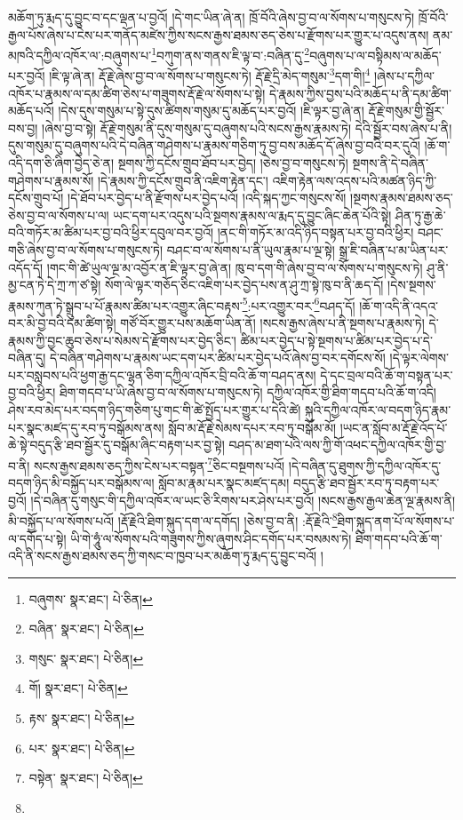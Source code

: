 མཆོག་ཏུ་རྨད་དུ་བྱུང་བ་དང་ལྡན་པ་བྱའོ། །དེ་གང་ཡིན་ཞེ་ན། ཁྲོ་བོའི་ཞེས་བྱ་བ་ལ་སོགས་པ་གསུངས་ཏེ། ཁྲོ་བོའི་རྒྱལ་པོས་ཞེས་པ་ངེས་པར་གནོད་མཛེས་ཀྱིས་སངས་རྒྱས་ཐམས་ཅད་ཅེས་པ་རྫོགས་པར་གྱུར་པ་འདུས་ནས། ནམ་མཁའི་དཀྱིལ་འཁོར་ལ་:བཞུགས་པ་\footnote{བཞུགས་  སྣར་ཐང་།  པེ་ཅིན། }བཀུག་ནས་གནས་ཇི་ལྟ་བ་:བཞིན་དུ་\footnote{བཞིན་  སྣར་ཐང་།  པེ་ཅིན། }བཞུགས་པ་ལ་བསྟིམས་ལ་མཆོད་པར་བྱའོ། །ཇི་ལྟ་ཞེ་ན། རྡོ་རྗེ་ཞེས་བྱ་བ་ལ་སོགས་པ་གསུངས་ཏེ། རྡོ་རྗེ་དྲི་མེད་གསུམ་\footnote{གསུང་  སྣར་ཐང་།  པེ་ཅིན། }དག་གི།\footnote{གོ།  སྣར་ཐང་།  པེ་ཅིན། } །ཞེས་པ་དཀྱིལ་འཁོར་པ་རྣམས་ལ་དམ་ཚིག་ཅེས་པ་གཟུགས་རྡོ་རྗེ་ལ་སོགས་པ་སྟེ། དེ་རྣམས་ཀྱིས་བྱས་པའི་མཆོད་པ་ནི་དམ་ཚིག་མཆོད་པའོ། །དེས་དུས་གསུམ་པ་སྟེ་དུས་ཚིགས་གསུམ་དུ་མཆོད་པར་བྱའོ། །ཇི་ལྟར་བྱ་ཞེ་ན། རྡོ་རྗེ་གསུམ་གྱི་སྦྱོར་བས་བྱ། །ཞེས་བྱ་བ་སྟེ། རྡོ་རྗེ་གསུམ་ནི་དུས་གསུམ་དུ་བཞུགས་པའི་སངས་རྒྱས་རྣམས་ཏེ། དེའི་སྦྱོར་བས་ཞེས་པ་ནི། དུས་གསུམ་དུ་བཞུགས་པའི་དེ་བཞིན་གཤེགས་པ་རྣམས་གཅིག་ཏུ་བྱ་བས་མཆོད་དོ་ཞེས་བྱ་བའི་བར་དུའོ། །ཆོ་ག་འདི་དག་ཅི་ཞིག་བྱེད་ཅེ་ན། སྔགས་ཀྱི་དངོས་གྲུབ་ཐོབ་པར་བྱེད། །ཅེས་བྱ་བ་གསུངས་ཏེ། སྔགས་ནི་དེ་བཞིན་གཤེགས་པ་རྣམས་སོ། །དེ་རྣམས་ཀྱི་དངོས་གྲུབ་ནི་འཇིག་རྟེན་དང་། འཇིག་རྟེན་ལས་འདས་པའི་མཚན་ཉིད་ཀྱི་དངོས་གྲུབ་པོ། །དེ་ཐོབ་པར་བྱེད་པ་ནི་རྫོགས་པར་བྱེད་པའོ། །འདི་སྐད་ཀྱང་གསུངས་སོ། །སྔགས་རྣམས་ཐམས་ཅད་ཅེས་བྱ་བ་ལ་སོགས་པ་ལ། ཡང་དག་པར་འདུས་པའི་སྔགས་རྣམས་ལ་རྨད་དུ་བྱུང་ཞིང་ཆེན་པོའི་སྟེ། ཤིན་ཏུ་རྒྱ་ཆེ་བའི་གཏོར་མ་ཚིམ་པར་བྱ་བའི་ཕྱིར་དབུལ་བར་བྱའོ། །ནང་གི་གཏོར་མ་འདི་ཉིད་བསྟན་པར་བྱ་བའི་ཕྱིར། བཤང་གཅི་ཞེས་བྱ་བ་ལ་སོགས་པ་གསུངས་ཏེ། བཤང་བ་ལ་སོགས་པ་ནི་ཡུལ་རྣམ་པ་ལྔ་སྟེ། སྒྲ་ཇི་བཞིན་པ་མ་ཡིན་པར་འདོད་དོ། །གང་གི་ཚེ་ཡུལ་ལྔ་མ་འབྱོར་ན་ཇི་ལྟར་བྱ་ཞེ་ན། ཁུ་བ་དག་གི་ཞེས་བྱ་བ་ལ་སོགས་པ་གསུངས་ཏེ། ཤུ་ནི་མྱ་ངན་ཏེ་དེ་ཀྲ་ཀ་ཙ་སྟེ། སོག་ལེ་ལྟར་གཅོད་ཅིང་འཇིག་པར་བྱེད་པས་ན་ཤུ་ཀྲ་སྟེ་ཁུ་བ་ནི་ཆད་དོ། །དེས་སྔགས་རྣམས་ཀུན་ཏེ་སྒྲུབ་པ་པོ་རྣམས་ཚིམ་པར་འགྱུར་ཞིང་བརྟས་\footnote{རྟས་  སྣར་ཐང་།  པེ་ཅིན། }:པར་འགྱུར་བར་\footnote{པར་  སྣར་ཐང་།  པེ་ཅིན། }བཤད་དོ། །ཆོ་ག་འདི་ནི་འདའ་བར་མི་བྱ་བའི་དམ་ཚིག་སྟེ། གཙོ་བོར་གྱུར་པས་མཆོག་ཡིན་ནོ། །སངས་རྒྱས་ཞེས་པ་ནི་སྔགས་པ་རྣམས་ཏེ། དེ་རྣམས་ཀྱི་བྱང་ཆུབ་ཅེས་པ་སེམས་དེ་རྫོགས་པར་བྱེད་ཅིང་། ཚིམ་པར་བྱེད་པ་སྟེ་སྔགས་པ་ཚིམ་པར་བྱེད་པ་དེ་བཞིན་དུ། དེ་བཞིན་གཤེགས་པ་རྣམས་ཡང་དག་པར་ཚིམ་པར་བྱེད་པའོ་ཞེས་བྱ་བར་དགོངས་སོ། །དེ་ལྟར་ལེགས་པར་བསླབས་པའི་ཕྱག་རྒྱ་དང་ལྷན་ཅིག་དཀྱིལ་འཁོར་བྲི་བའི་ཆོ་ག་བཤད་ནས། དེ་དང་བྲལ་བའི་ཆོ་ག་བསྟན་པར་བྱ་བའི་ཕྱིར། ཐིག་གདབ་པ་ཡི་ཞེས་བྱ་བ་ལ་སོགས་པ་གསུངས་ཏེ། དཀྱིལ་འཁོར་གྱི་ཐིག་གདབ་པའི་ཆོ་ག་འདི། ཤེས་རབ་མེད་པར་བདག་ཉིད་གཅིག་པུ་གང་གི་ཚེ་སྤྱོད་པར་གྱུར་པ་དེའི་ཚེ། སྐུའི་དཀྱིལ་འཁོར་ལ་བདག་ཉིད་རྣམ་པར་སྣང་མཛད་དུ་རབ་ཏུ་བསྒོམས་ནས། སློབ་མ་རྡོ་རྗེ་སེམས་དཔར་རབ་ཏུ་བསྒོམ་མོ། །ཡང་ན་སློབ་མ་རྡོ་རྗེ་འོད་པོ་ཆེ་སྟེ་བདུད་རྩི་ཐབ་སྦྱོར་དུ་བསྒོམ་ཞིང་བརྟག་པར་བྱ་སྟེ། བཤད་མ་ཐག་པའི་ལས་ཀྱི་གོ་འཕང་དཀྱིལ་འཁོར་གྱི་བྱ་བ་ནི། སངས་རྒྱས་ཐམས་ཅད་ཀྱིས་ངེས་པར་བསྟན་\footnote{བསྟེན་  སྣར་ཐང་།  པེ་ཅིན། }ཅིང་བསྔགས་པའོ། །དེ་བཞིན་དུ་ཐུགས་ཀྱི་དཀྱིལ་འཁོར་དུ་བདག་ཉིད་མི་བསྐྱོད་པར་བསྒོམས་ལ། སློབ་མ་རྣམ་པར་སྣང་མཛད་དམ། བདུད་རྩི་ཐབ་སྦྱོར་རབ་ཏུ་བརྟག་པར་བྱའོ། །དེ་བཞིན་དུ་གསུང་གི་དཀྱིལ་འཁོར་ལ་ཡང་ཅི་རིགས་པར་ཤེས་པར་བྱའོ། །སངས་རྒྱས་རྒྱལ་ཆེན་ལྔ་རྣམས་ནི། མི་བསྐྱོད་པ་ལ་སོགས་པའོ། །རྡོ་རྗེའི་ཐིག་སྐུད་དག་ལ་དགོད། །ཅེས་བྱ་བ་ནི། :རྡོ་རྗེའི་\footnote{}ཐིག་སྐུད་ནག་པོ་ལ་སོགས་པ་ལ་དགོད་པ་སྟེ། ཡི་གེ་ཧཱུཾ་ལ་སོགས་པའི་གཟུགས་ཀྱིས་ཞུགས་ཤིང་དགོད་པར་བསམས་ཏེ། ཐིག་གདབ་པའི་ཆོ་ག་འདི་ནི་སངས་རྒྱས་ཐམས་ཅད་ཀྱི་གསང་བ་ཁྱབ་པར་མཆོག་ཏུ་རྨད་དུ་བྱུང་བའོ། །
